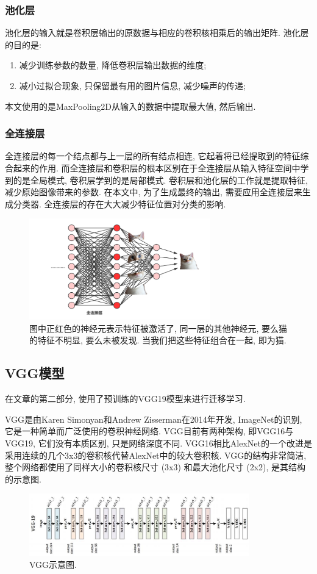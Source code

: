 \documentclass[lang=cn,11pt]{elegantpaper}
\begin{document}
\subsubsection*{池化层}
池化层的输入就是卷积层输出的原数据与相应的卷积核相乘后的输出矩阵. 池化层的目的是: 
\begin{enumerate}
	\item 减少训练参数的数量, 降低卷积层输出数据的维度; 
	\item 减小过拟合现象, 只保留最有用的图片信息, 减少噪声的传递; 
\end{enumerate}
本文使用的是MaxPooling2D从输入的数据中提取最大值, 然后输出. 
\subsubsection*{全连接层}
全连接层的每一个结点都与上一层的所有结点相连, 它起着将已经提取到的特征综合起来的作用. 而全连接层和卷积层的根本区别在于全连接层从输入特征空间中学到的是全局模式, 卷积层学到的是局部模式. 卷积层和池化层的工作就是提取特征, 减少原始图像带来的参数. 在本文中, 为了生成最终的输出, 需要应用全连接层来生成分类器. 全连接层的存在大大减少特征位置对分类的影响. 
\begin{figure}[htbp]
\centering
  \includegraphics[width=0.7\textwidth]{densecat.png}
  \tiny
  \caption{图中正红色的神经元表示特征被激活了, 同一层的其他神经元, 要么猫的特征不明显, 要么未被发现. 当我们把这些特征组合在一起, 即为猫. \label{fig:densecat1}}
\end{figure}
\normalsize
\subsection{VGG模型}
在文章的第二部分, 使用了预训练的VGG19模型来进行迁移学习. 

VGG是由Karen Simonyan和Andrew Zisserman在2014年开发, ImageNet的识别, 它是一种简单而广泛使用的卷积神经网络. VGG目前有两种架构, 即VGG16与VGG19, 它们没有本质区别, 只是网络深度不同. VGG16相比AlexNet的一个改进是采用连续的几个3x3的卷积核代替AlexNet中的较大卷积核. VGG的结构非常简洁, 整个网络都使用了同样大小的卷积核尺寸 (3x3) 和最大池化尺寸 (2x2),  是其结构的示意图. 
\begin{figure}[htbp]
	\centering
	  \includegraphics[width=0.85\textwidth]{VGG}
	  \tiny
	  \caption{VGG示意图.\label{fig:vgg}}
\end{figure}
\end{document}
